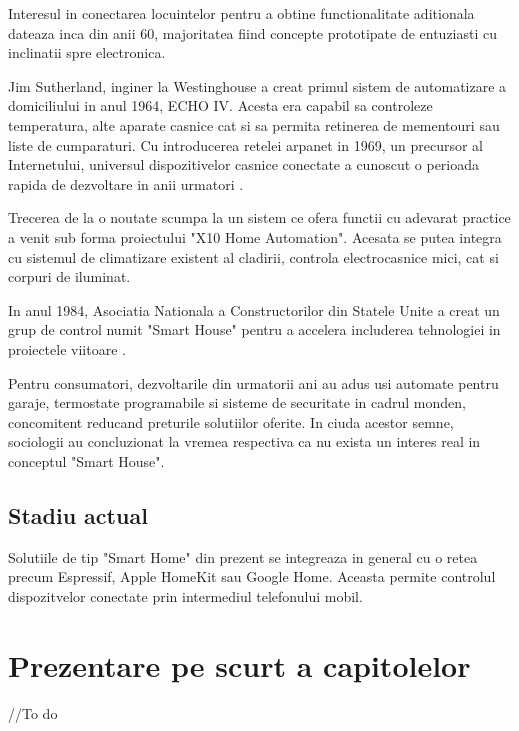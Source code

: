 Interesul in conectarea locuintelor pentru a obtine functionalitate aditionala dateaza inca din anii 60, majoritatea fiind concepte prototipate de entuziasti cu inclinatii spre electronica.

Jim Sutherland, inginer la Westinghouse a creat primul sistem de automatizare a domiciliului in anul 1964, ECHO IV. Acesta era capabil sa controleze temperatura, alte aparate casnice cat si sa permita retinerea de mementouri sau liste de cumparaturi. Cu introducerea retelei \acrfull{arpanet} in 1969, un precursor al Internetului, universul dispozitivelor casnice conectate a cunoscut o perioada rapida de dezvoltare in anii urmatori \cite{ZeusIntegratedSystems}.

Trecerea de la o noutate scumpa la un sistem ce ofera functii cu adevarat practice a venit sub forma proiectului "X10 Home Automation". Acesata se putea integra cu sistemul de climatizare existent al cladirii, controla electrocasnice mici, cat si corpuri de iluminat.

In anul 1984, Asociatia Nationala a Constructorilor din Statele Unite a creat un grup de control numit "Smart House" pentru a accelera includerea tehnologiei in proiectele viitoare \cite{Aldrich2003Smart}.

Pentru consumatori, dezvoltarile din urmatorii ani au adus usi automate pentru garaje, termostate programabile si sisteme de securitate in cadrul monden, concomitent reducand preturile solutiilor oferite. In ciuda acestor semne, sociologii au concluzionat la vremea respectiva ca nu exista un interes real in conceptul "Smart House".


\subsection {Stadiu actual}

Solutiile de tip "Smart Home" din prezent se integreaza in general cu o retea precum Espressif, Apple HomeKit sau Google Home. Aceasta permite controlul dispozitvelor conectate prin intermediul telefonului mobil.


\section {Prezentare pe scurt a capitolelor}

//To do